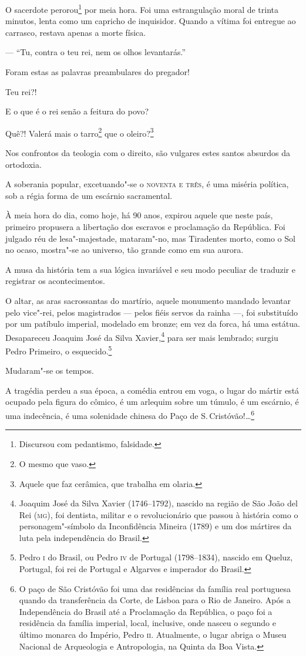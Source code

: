 O sacerdote perorou\footnote{Discursou com pedantismo, falsidade.} por
meia hora. Foi uma estrangulação moral de trinta minutos, lenta como um
capricho de inquisidor. Quando a vítima foi entregue ao carrasco,
restava apenas a morte física.

--- ``Tu, contra o teu rei, nem os olhos levantarás.''

Foram estas as palavras preambulares do pregador!

Teu rei?!

E o que é o rei senão a feitura do povo?

Quê?! Valerá mais o tarro\footnote{O mesmo que vaso.} que o
oleiro?\footnote{Aquele que faz cerâmica, que trabalha em olaria.}

Nos confrontos da teologia com o direito, são vulgares estes santos
absurdos da ortodoxia.

A soberania popular, excetuando"-se o \textsc{noventa e três}, é uma miséria
política, sob a régia forma de um escárnio sacramental.

\noindent\dotfill{}

À meia hora do dia, como hoje, há 90 anos, expirou aquele que neste
país, primeiro propusera a libertação dos escravos e proclamação da
República. Foi julgado réu de lesa"-majestade, mataram"-no, mas Tiradentes
morto, como o Sol no ocaso, mostra"-se ao universo, tão grande como em
sua aurora.

\noindent\dotfill{}

A musa da história tem a sua lógica invariável e seu modo peculiar de
traduzir e registrar os acontecimentos.

O altar, as aras sacrossantas do martírio, aquele monumento mandado
levantar pelo vice"-rei, pelos magistrados --- pelos fiéis servos da
rainha ---, foi substituído por um patíbulo imperial, modelado em
bronze; em vez da forca, há uma estátua. Desapareceu Joaquim José da
Silva Xavier,\footnote{Joaquim José da Silva Xavier (1746--1792),
  nascido na região de São João del Rei (\textsc{mg}), foi dentista, militar e o
  revolucionário que passou à história como o personagem"-símbolo da
  Inconfidência Mineira (1789) e um dos mártires da luta pela
  independência do Brasil.} para ser mais lembrado; surgiu Pedro
Primeiro, o esquecido.\footnote{Pedro \textsc{i} do Brasil, ou Pedro \textsc{iv} de
  Portugal (1798--1834), nascido em Queluz, Portugal, foi rei de Portugal
  e Algarves e imperador do Brasil.}

Mudaram"-se os tempos.

A tragédia perdeu a sua época, a comédia entrou em voga, o lugar do
mártir está ocupado pela figura do cômico, é um arlequim sobre um
túmulo, é um escárnio, é uma indecência, é uma solenidade chinesa do
Paço de S.\,Cristóvão!\ldots{}\footnote{O paço de São Cristóvão foi uma das
  residências da família real portuguesa quando da transferência da
  Corte, de Lisboa para o Rio de Janeiro. Após a Independência do Brasil
  até a Proclamação da República, o paço foi a residência da família
  imperial, local, inclusive, onde nasceu o segundo e último monarca do
  Império, Pedro \textsc{ii}. Atualmente, o lugar abriga o Museu Nacional de
  Arqueologia e Antropologia, na Quinta da Boa Vista.}

